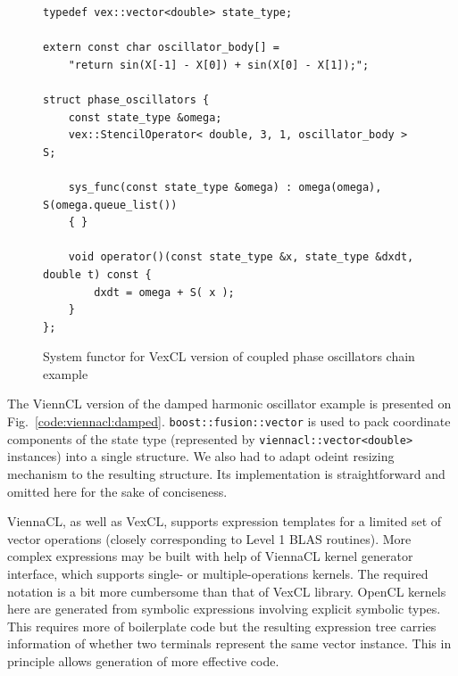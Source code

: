 \documentclass[1p]{elsarticle}
\newcommand{\code}[1]{\lstinline|#1|}
\newcommand{\figref}[1]{Fig.~\ref{#1}}
\begin{document}
\begin{figure}[p]
\begin{lstlisting}
typedef vex::vector<double> state_type;

extern const char oscillator_body[] =
    "return sin(X[-1] - X[0]) + sin(X[0] - X[1]);";

struct phase_oscillators {
    const state_type &omega;
    vex::StencilOperator< double, 3, 1, oscillator_body > S;

    sys_func(const state_type &omega) : omega(omega), S(omega.queue_list())
    { }

    void operator()(const state_type &x, state_type &dxdt, double t) const {
        dxdt = omega + S( x );
    }
};
\end{lstlisting}
\caption{System functor for VexCL version of coupled phase oscillators chain
example}
\label{code:vexcl:phase}
\end{figure}

The ViennCL version of the damped harmonic oscillator example is presented on
\figref{code:viennacl:damped}. \code{boost::fusion::vector} is used to pack
coordinate components of the state type (represented by
\code{viennacl::vector<double>} instances) into a single structure. We also had
to adapt odeint resizing mechanism to the resulting structure. Its
implementation is straightforward and omitted here for the sake of conciseness.

ViennaCL, as well as VexCL, supports expression templates for a limited set of
vector operations (closely corresponding to Level 1 BLAS routines). More
complex expressions may be built with help of ViennaCL kernel generator
interface, which supports single- or multiple-operations kernels. The required
notation is a bit more cumbersome than that of VexCL library. OpenCL kernels
here are generated from symbolic expressions involving explicit symbolic types.
This requires more of boilerplate code but the resulting expression tree
carries information of whether two terminals represent the same vector
instance. This in principle allows generation of more effective code.
\end{document}

